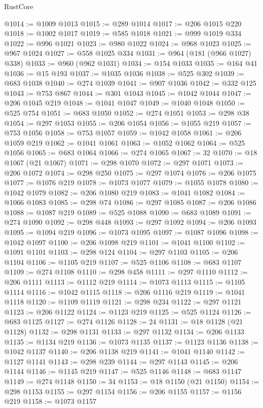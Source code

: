\begin{lexlean}{RustCore}
\begin{coremodule}
@1014 := @1009 @1013
@1015 := @289 @1014
@1017 := @206 @1015 @220
@1018 := @1002 @1017
@1019 := @585 @1018
@1021 := @999 @1019 @334
@1022 := @996 @1021
@1023 := @980 @1022
@1024 := @968 @1023
@1025 := @967 @1024
@1027 := @558 @1025 @334
@1031 := @964 (@181 (@966 @1027) @338)
@1033 := @960 (@962 @1031)
@1034 := @154 @1033
@1035 := @164 @41
@1036 := @15 @193
@1037 := @1035 @1036
@1038 := @525 @302
@1039 := @683 @1038
@1040 := @274 @1039
@1041 := @907 @1036
@1042 := @332 @125
@1043 := @753 @867
@1044 := @301 @1043
@1045 := @1042 @1044
@1047 := @206 @1045 @219
@1048 := @1041 @1047
@1049 := @1040 @1048
@1050 := @525 @754
@1051 := @683 @1050
@1052 := @274 @1051
@1053 := @298 @38
@1054 := @297 @1053
@1055 := @206 @1054
@1056 := @1055 @219
@1057 := @753 @1056
@1058 := @753 @1057
@1059 := @1042 @1058
@1061 := @206 @1059 @219
@1062 := @1041 @1061
@1063 := @1052 @1062
@1064 := @525 @1056
@1065 := @683 @1064
@1066 := @274 @1065
@1067 := 32
@1070 := @18 @1067 (@21 @1067)
@1071 := @298 @1070
@1072 := @297 @1071
@1073 := @206 @1072
@1074 := @298 @250
@1075 := @297 @1074
@1076 := @206 @1075
@1077 := @1076 @219
@1078 := @1073 @1077
@1079 := @1055 @1078
@1080 := @1042 @1079
@1082 := @206 @1080 @219
@1083 := @1041 @1082
@1084 := @1066 @1083
@1085 := @298 @74
@1086 := @297 @1085
@1087 := @206 @1086
@1088 := @1087 @219
@1089 := @525 @1088
@1090 := @683 @1089
@1091 := @274 @1090
@1092 := @298 @448
@1093 := @297 @1092
@1094 := @206 @1093
@1095 := @1094 @219
@1096 := @1073 @1095
@1097 := @1087 @1096
@1098 := @1042 @1097
@1100 := @206 @1098 @219
@1101 := @1041 @1100
@1102 := @1091 @1101
@1103 := @298 @124
@1104 := @297 @1103
@1105 := @206 @1104
@1106 := @1105 @219
@1107 := @525 @1106
@1108 := @683 @1107
@1109 := @274 @1108
@1110 := @298 @458
@1111 := @297 @1110
@1112 := @206 @1111
@1113 := @1112 @219
@1114 := @1073 @1113
@1115 := @1105 @1114
@1116 := @1042 @1115
@1118 := @206 @1116 @219
@1119 := @1041 @1118
@1120 := @1109 @1119
@1121 := @298 @234
@1122 := @297 @1121
@1123 := @206 @1122
@1124 := @1123 @219
@1125 := @525 @1124
@1126 := @683 @1125
@1127 := @274 @1126
@1128 := 24
@1131 := @18 @1128 (@21 @1128)
@1132 := @298 @1131
@1133 := @297 @1132
@1134 := @206 @1133
@1135 := @1134 @219
@1136 := @1073 @1135
@1137 := @1123 @1136
@1138 := @1042 @1137
@1140 := @206 @1138 @219
@1141 := @1041 @1140
@1142 := @1127 @1141
@1143 := @298 @239
@1144 := @297 @1143
@1145 := @206 @1144
@1146 := @1145 @219
@1147 := @525 @1146
@1148 := @683 @1147
@1149 := @274 @1148
@1150 := 34
@1153 := @18 @1150 (@21 @1150)
@1154 := @298 @1153
@1155 := @297 @1154
@1156 := @206 @1155
@1157 := @1156 @219
@1158 := @1073 @1157

\end{coremodule}
\end{lexlean}
